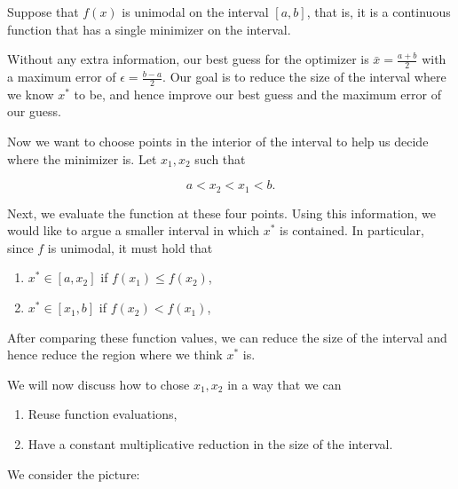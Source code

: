 \documentclass[../open-optimization/open-optimization.tex]{subfiles}
\begin{document}
Suppose that $f(x)$ is unimodal on the interval $[a,b]$, that is, it is a continuous function that has a single minimizer on the interval.  

Without any extra information, our best guess for the optimizer is $\bar x = \tfrac{a+ b}{2}$ with a maximum error of $\epsilon = \tfrac{b-a}{2}$.    Our goal is to reduce the size of the interval where we know $x^*$ to be, and hence improve our best guess and the maximum error of our guess.


 Now we want to choose points in the interior of the interval to help us decide where the minimizer is.  Let $x_1, x_2$ such that 

$$
a < x_2 < x_1 < b.
$$

Next, we evaluate the function at these four points.  Using this information, we would like to argue a smaller interval in which $x^*$ is contained.  In particular, since $f$ is unimodal, it must hold that 
\begin{enumerate}
\item $x^* \in [a, x_2]$ if  $f(x_1) \leq f(x_2)$, 
\item $x^* \in [x_1,b]$ if $f(x_2) < f(x_1)$,
\end{enumerate}


After comparing these function values, we can reduce the size of the interval and hence reduce the region where we think $x^*$ is.   


We will now discuss how to chose $x_1,x_2$ in a way that we can 
\begin{enumerate}
\item Reuse function evaluations,
\item Have a constant multiplicative reduction in the size of the interval.
\end{enumerate}


We consider the picture:\\
\end{document}
